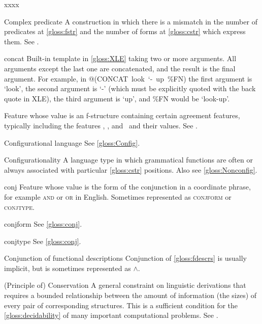 \documentclass[output=paper,colorlinks,citecolor=brown]{langscibook}
\begin{document}
\begin{labeling}{xxxx}
\item[Complex predicate] A construction in which there is a mismatch in the number of predicates at \ref{gloss:fstr} and the number of forms at \ref{gloss:cstr} which express them.  See .

\item[concat] Built-in template in \ref{gloss:XLE} taking two or more arguments.  All arguments except the last one are concatenated, and the result is the final argument.  For example, in \mbox{@(CONCAT look `- up \%FN)} the first argument is `look', the second argument is `-' (which must be explicitly quoted with the back quote in XLE), the third argument is `up', and \%FN would be `look-up'.

\item[\CONCORD] Feature whose value is an f-structure containing certain agreement features, typically including the features \GEND, \NUM, and \CASE\ and their values.  See \citetv[\ref{sec:indexconcord}]{chapters/Agreement}.

\item[Configurational language] See \ref{gloss:Config}.

\item[Configurationality\namedlabel{gloss:Config}{Configurationality}] A language type in which grammatical functions are often or always associated with particular \ref{gloss:cstr} positions.  Also see \ref{gloss:Nonconfig}.

\item[conj\namedlabel{gloss:conj}{\textsc{conj}}] Feature whose value is the form of the conjunction in a coordinate phrase, for example \textsc{and} or \textsc{or} in English. Sometimes represented as \textsc{conjform} or \textsc{conjtype}.

\item[conjform] See \ref{gloss:conj}.

\item[conjtype] See \ref{gloss:conj}.

\item[Conjunction\namedlabel{gloss:Conjunction}{Conjunction} of functional descriptions] Conjunction of \ref{gloss:fdescrs} is usually implicit, but is sometimes represented as $\wedge$.

\item[(Principle of) Conservation\namedlabel{gloss:Conservation}{Conservation}] A general constraint on linguistic derivations that requires a bounded relationship between the amount of information (the sizes) of every pair of corresponding structures.  This is a sufficient condition for the \ref{gloss:decidability} of many important computational problems.  See .


\end{labeling}
\end{document}
